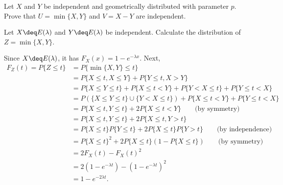 \begin{exercise}
  Let $X$ and $Y$ be independent and geometrically distributed with parameter $p$. Prove that $U=\min\{X,Y\}$ and $V=X-Y$ are independent.
\end{exercise}
\begin{solution}
  [TODO]
\end{solution}


\begin{exercise}
  Let $X\deq E(\lambda)$ and $Y\deq E(\lambda)$ be independent. Calculate the distribution of $Z=\min\{X,Y\}$.
\end{exercise}
\begin{solution}
  Since $X\deq E(\lambda)$, it has $F_X(x)=1-e^{-\lambda x}$. Next,
  \begin{align*}
    F_Z(t) = P\{Z\leq t\} &= P\{\min\{X,Y\}\leq t\} \\
      &= P\{X\leq t, X\leq Y\} + P\{Y\leq t, X>Y\} \\
      &= P\{X\leq Y\leq t \} + P\{X\leq t<Y\} + P\{Y< X\leq t\} + P\{Y\leq t< X\} \\
      &= P(\{X\leq Y\leq t\}\cup\{Y<X\leq t\}) + P\{X\leq t<Y\} + P\{Y\leq t< X\} \\
      &= P\{X\leq t, Y\leq t\} + 2P\{X\leq t<Y\} \qquad\mbox{(by symmetry)} \\
      &= P\{X\leq t, Y\leq t\} + 2P\{X\leq t, Y>t\} \\
      &= P\{X\leq t\}P\{Y\leq t\} + 2P\{X\leq t\}P\{Y>t\} \qquad\mbox{(by independence)} \\
      &= P\{X\leq t\}^2 + 2P\{X\leq t\}(1-P\{X\leq t\}) \qquad\mbox{(by symmetry)} \\
      &= 2F_X(t) - F_X(t)^2 \\
      &= 2(1-e^{-\lambda t}) - (1-e^{-\lambda t})^2 \\
      &= 1 - e^{-2\lambda t} .
  \end{align*}
\end{solution}
